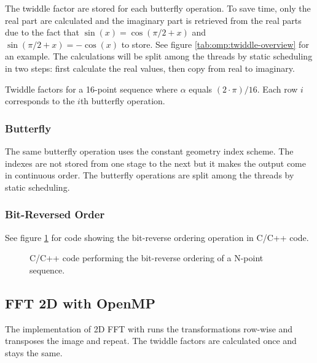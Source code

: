 The twiddle factor are stored for each butterfly operation. To save time, only the real part are calculated and the imaginary part is retrieved from the real parts due to the fact that $\sin(x) = \cos(\pi/2 + x)$ and $\sin(\pi/2 + x) = -\cos(x)$ to store. See figure \ref{tab:omp:twiddle-overview} for an example. The calculations will be split among the threads by static scheduling in two steps: first calculate the real values, then copy from real to imaginary.

\begin{table}
	\centering
	
	\caption{Twiddle factors for a 16-point sequence where $\alpha$ equals $(2 \cdot \pi) / 16$. Each row $i$ corresponds to the $i$th butterfly operation.}
	\label{tab:omp:twiddle-overview}
\end{table}

\subsubsection{Butterfly}

The same butterfly operation uses the constant geometry index scheme. The indexes are not stored from one stage to the next but it makes the output come in continuous order. The butterfly operations are split among the threads by static scheduling.

\subsubsection{Bit-Reversed Order}

See figure \ref{fig:omp:bit-reverse-order} for code showing the bit-reverse ordering operation in C/C++ code.

\begin{figure}
	\centering
	\begin{framed}
			
	\end{framed}
	\caption{ C/C++ code performing the bit-reverse ordering of a N-point sequence. }
	\label{fig:omp:bit-reverse-order}
\end{figure}

\subsection{FFT 2D with OpenMP}

The implementation of \gls{2D} \gls{FFT} with {\OMP} runs the transformations row-wise and transposes the image and repeat. The twiddle factors are calculated once and stays the same.

